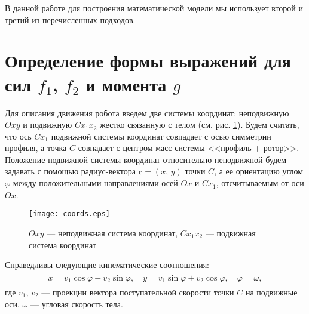 В данной работе для построения математической модели мы использует второй и третий из перечисленных подходов.


\newpage

\section{Определение формы выражений для сил $f_1$, $f_2$ и момента $g$}



Для описания движения робота введем две системы координат: неподвижную $Oxy$ и подвижную $Cx_1x_2$ жестко связанную с телом (см. рис. \ref{fig.coords}). Будем считать, что ось $Cx_1$ подвижной системы координат совпадает с осью симметрии профиля, а точка $C$ совпадает с центром масс системы <<профиль + ротор>>. Положение подвижной системы координат относительно неподвижной будем задавать с помощью радиус-вектора $\bm r = (x,\, y)$ точки $C$, а ее ориентацию углом $\varphi$ между положительными направлениями осей $Ox$ и $Cx_1$, отсчитываемым от оси $Ox$.

\begin{figure}[h!]
	\centering
	\texttt{[image: coords.eps]}
	\caption{$Oxy$ --- неподвижная система координат, $Cx_1x_2$ --- подвижная система координат}\label{fig.coords}
\end{figure}

Справедливы следующие кинематические соотношения:
\begin{gather}
\begin{gathered}
\dot{x} = v_1 \cos\varphi - v_2 \sin\varphi,\quad \dot{y} = v_1 \sin\varphi + v_2 \cos\varphi,\quad \dot{\varphi} = \omega,
\end{gathered}\label{eq.kinem}
\end{gather}
где $v_1$, $v_2$ --- проекции вектора поступательной скорости точки $C$ на подвижные оси, $\omega$ --- угловая скорость тела.

